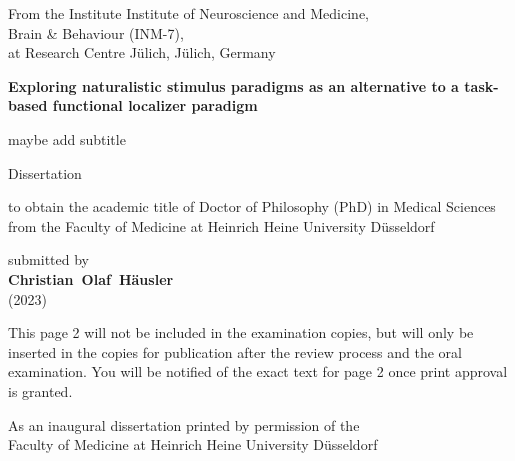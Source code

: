 \documentclass[english,12pt]{report}
\begin{document}
\pagestyle{plain}
\begin{spacing}{1.5}




\begin{titlepage}
\begin{center}

From the Institute Institute of Neuroscience and Medicine,\\
Brain \& Behaviour (INM-7),\\
at Research Centre Jülich, Jülich, Germany

\vfill

\textbf{{\large Exploring naturalistic stimulus paradigms as an alternative to a
    task-based functional localizer paradigm}}

maybe add subtitle

\vfill

{\large Dissertation}

\vfill

to obtain the academic title of Doctor of Philosophy (PhD) in Medical Sciences\\
from the Faculty of Medicine at Heinrich Heine University Düsseldorf

\vfill

submitted by\\
\textbf{Christian~Olaf~Häusler}\\
(2023)

\end{center}
\end{titlepage}




\newpage

\noindent This page 2 will not be included in the examination copies, but will
only be inserted in the copies for publication after the review process and
the oral examination. You will be notified of the exact text for page 2 once
print approval is granted.

\vfill
\noindent As an inaugural dissertation printed by permission of the\\
Faculty of Medicine at Heinrich Heine University Düsseldorf


\end{spacing}
\end{document}
